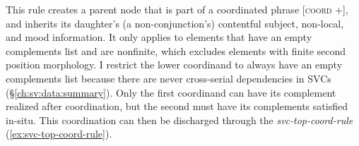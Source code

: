 This rule creates a parent node that is part of a coordinated phrase [\textsc{coord} +], and inherits its daughter's (a non-conjunction's) contentful subject, non-local, and mood information. It only applies to elements that have an empty complements list and are nonfinite, which excludes elements with finite second position morphology. I restrict the lower coordinand to always have an empty complements list because there are never cross-serial dependencies in SVCs (\S\ref{ch:sv:data:summary}). Only the first coordinand can have its complement realized after coordination, but the second must have its complements satisfied in-situ. This coordination can then be discharged through the {\textit{svc-top-coord-rule}} (\ref{ex:svc-top-coord-rule}).

\begin{singlespacing}
\ex \label{ex:svc-top-coord-rule}
\xe
\end{singlespacing}


